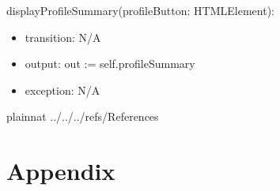 \documentclass[12pt, titlepage]{article}
\begin{document}
\noindent displayProfileSummary(profileButton: HTMLElement):
\begin{itemize}
\item transition: N/A
\item output: out := self.profileSummary
\item exception: N/A
\end{itemize}



\newpage

 {plainnat}
 {../../../refs/References}

\newpage

\section{Appendix} \label{Appendix}

\end{document}

